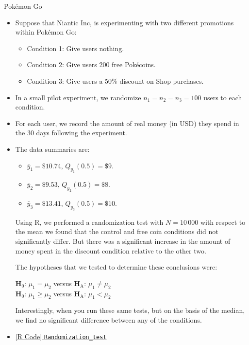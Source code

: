 \begin{Example}{Pokémon Go}{}
      \begin{itemize}
            \item Suppose that Niantic Inc, is experimenting with two different promotions within Pokémon
                  Go:
                  \begin{itemize}
                        \item Condition 1: Give users nothing.
                        \item Condition 2: Give users 200 free Pokécoins.
                        \item Condition 3: Give users a 50\% discount on Shop purchases.
                  \end{itemize}
            \item In a small pilot experiment, we randomize $ n_1=n_2=n_3=100 $ users to each condition.
            \item For each user, we record the amount of real money (in USD) they spend in the 30 days
                  following the experiment.
            \item The data summaries are:
                  \begin{itemize}
                        \item $ \bar{y}_1=\$10.74 $, $ Q_{y_1}(0.5)=\$9 $.
                        \item $ \bar{y}_2=\$9.53 $, $ Q_{y_2}(0.5)=\$8 $.
                        \item $ \bar{y}_3=\$13.41 $, $ Q_{y_3}(0.5)=\$10 $.
                  \end{itemize}
                  Using R, we performed a randomization test with $ N=10\,000 $ with respect to the mean
                  we found that the control and free coin conditions did not significantly differ.
                  But there was a significant increase in the amount of money spent in the discount condition
                  relative to the other two.

                  \vspace{2mm}

                  The hypotheses that we tested to determine these conclusions were:
                  \begin{tightcenter}
                        $ \mathbf{H}_0 $: $ \mu_1=\mu_2 $ versus $ \mathbf{H}_\text{A} $: $ \mu_1\ne \mu_2 $\\
                        $ \mathbf{H}_0 $: $ \mu_1\ge \mu_2 $ versus $ \mathbf{H}_\text{A} $: $ \mu_1<\mu_2 $
                  \end{tightcenter}
                  Interestingly, when you run these same tests, but on the basis of the median, we find
                  no significant difference between any of the conditions.
            \item \href{https://github.com/Hextical/university-notes/blob/master/year-3/semester-3/STAT 430/code/W3/Randomization_test.R}{[R Code] \texttt{Randomization\_test}}
      \end{itemize}
\end{Example}
